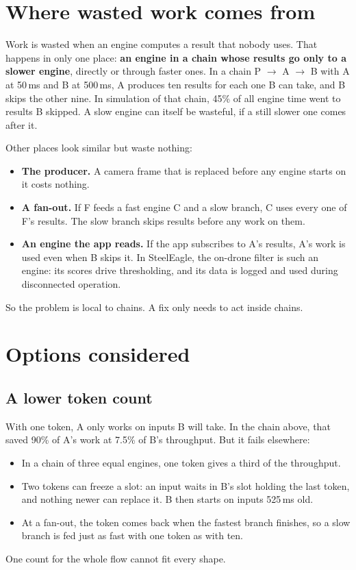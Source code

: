 \documentclass[11pt]{article}
\begin{document}
\section{Where wasted work comes from}

Work is wasted when an engine computes a result that nobody uses. That
happens in only one place: \textbf{an engine in a chain whose results go
only to a slower engine}, directly or through faster ones. In a chain
P $\to$ A $\to$ B with A at 50\,ms and B at 500\,ms, A produces ten results
for each one B can take, and B skips the other nine. In simulation of that
chain, 45\% of all engine time went to results B skipped. A slow engine can
itself be wasteful, if a still slower one comes after it.

Other places look similar but waste nothing:
\begin{itemize}[nosep]
  \item \textbf{The producer.} A camera frame that is replaced before any
        engine starts on it costs nothing.
  \item \textbf{A fan-out.} If F feeds a fast engine C and a slow branch,
        C uses every one of F's results. The slow branch skips results
        before any work on them.
  \item \textbf{An engine the app reads.} If the app subscribes to A's
        results, A's work is used even when B skips it. In SteelEagle, the
        on-drone filter is such an engine: its scores drive thresholding,
        and its data is logged and used during disconnected operation.
\end{itemize}
So the problem is local to chains. A fix only needs to act inside chains.

\section{Options considered}

\subsection{A lower token count}

With one token, A only works on inputs B will take. In the chain above, that
saved 90\% of A's work at 7.5\% of B's throughput. But it fails elsewhere:
\begin{itemize}[nosep]
  \item In a chain of three equal engines, one token gives a third of the
        throughput.
  \item Two tokens can freeze a slot: an input waits in B's slot holding the
        last token, and nothing newer can replace it. B then starts on
        inputs 525\,ms old.
  \item At a fan-out, the token comes back when the fastest branch finishes,
        so a slow branch is fed just as fast with one token as with ten.
\end{itemize}
One count for the whole flow cannot fit every shape.
\end{document}
